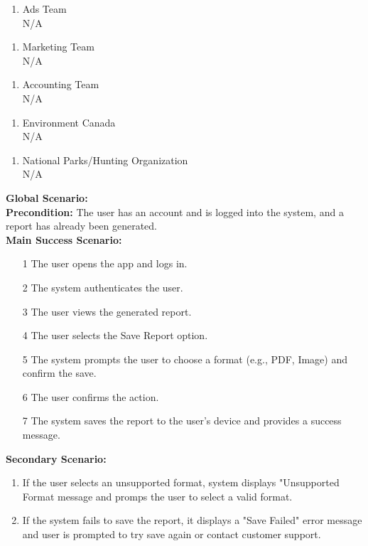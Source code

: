 \documentclass[]{article}
\begin{document}
\begin{enumerate}[{\bf BE1.}]
\begin{enumerate}[{\bf VP2.}]
    \item Ads Team \\
    N/A
\end{enumerate}

\begin{enumerate}[{\bf VP3.}]
    \item Marketing Team \\
    N/A
\end{enumerate}

\begin{enumerate}[{\bf VP4.}]
    \item Accounting Team \\
    N/A
\end{enumerate}

\begin{enumerate}[{\bf VP5.}]
    \item Environment Canada \\
    N/A
\end{enumerate}

\begin{enumerate}[{\bf VP6.}]
    \item National Parks/Hunting Organization \\
    N/A
\end{enumerate}

\textbf{Global Scenario:} \\

\textbf{Precondition:} The user has an account and is logged into the system, and a report has already been generated. \\

\textbf{Main Success Scenario:}
\begin{enumerate}
    \item[1] The user opens the app and logs in.
    \item[2] The system authenticates the user.
    \item[3] The user views the generated report.
    \item[4] The user selects the Save Report option.
    \item[5] The system prompts the user to choose a format (e.g., PDF, Image) and confirm the save.
    \item[6] The user confirms the action.
    \item[7] The system saves the report to the user’s device and provides a success message.
\end{enumerate}

\textbf{Secondary Scenario:}
\begin{enumerate}
    \item If the user selects an unsupported format, system displays "Unsupported Format message and promps the user to select a valid format.
    \item If the system fails to save the report, it displays a "Save Failed" error message and user is prompted to try save again or contact customer support.
\end{enumerate}

    

\end{enumerate}
\end{document}

